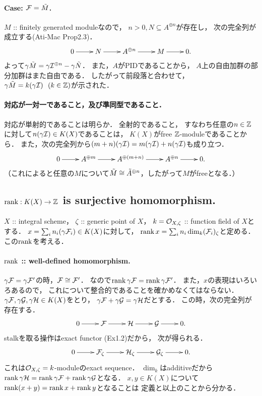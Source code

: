 \documentclass[a4paper]{jsarticle}
\begin{document}
    \paragraph{Case: $\mathcal{F}=\tilde{M}$.}
    $M$ :: finitely generated moduleなので，
    $n>0, N \subseteq A^{\oplus n}$が存在し，
    次の完全列が成立する(Ati-Mac Prop2.3)．
    \[
        \xymatrix
        {
            0 \ar[r]& N \ar[r]& A^{\oplus n} \ar[r]& M \ar[r]& 0.
        }
    \]
    よって$\gamma \tilde{M}=\gamma \mathcal{I}^{\oplus n}-\gamma \tilde{N}$．
    また，$A$がPIDであることから，
    $A$上の自由加群の部分加群はまた自由である．
    したがって前段落と合わせて，
    $\gamma \tilde{M}=k (\gamma \mathcal{I}) ~~(k \in \mathbb{Z})$が示された．

    \paragraph{対応が一対一であること，及び準同型であること．}
    対応が単射的であることは明らか．
    全射的であること，
    すなわち任意の$n \in \mathbb{Z}$に対して$n(\gamma\mathcal{I}) \in K(X)$であることは，
    $K(X)$がfree $\mathbb{Z}$-moduleであることから．
    また，次の完全列から$(m+n) (\gamma \mathcal{I})=m(\gamma \mathcal{I})+n(\gamma \mathcal{I})$も成り立つ．
    \[
        \xymatrix
        {
            0 \ar[r]& A^{\oplus m} \ar[r]& A^{\oplus (m+n)} \ar[r]& A^{\oplus n} \ar[r]& 0.
        }
    \]
    （これによると任意の$M$について$\tilde{M} \cong \tilde{A}^{\oplus n}$，したがって$M$がfreeとなる．）

    \subsection{$\operatorname{rank}: K(X) \to \mathbb{Z}$ is surjective homomorphism.}
    $X$ :: integral scheme，
    $\zeta$ :: generic point of $X$，
    $k=\mathcal{O}_{X, \zeta}$ :: function field of $X$とする．
    $x=\sum_{i} n_i (\gamma \mathcal{F}_i) \in K(X)$に対して，
    $\operatorname{rank} x=\sum_{i} n_i \dim_k (\mathcal{F}_i)_{\zeta}$と定める．
    この$\operatorname{rank}$を考える．

    \paragraph{$\operatorname{rank}$ :: well-defined homomorphism.}
    $\gamma \mathcal{F}=\gamma \mathcal{F}'$の時，$\mathcal{F} \cong \mathcal{F}'$．
    なので$\operatorname{rank} \gamma \mathcal{F}=\operatorname{rank} \gamma \mathcal{F}'$．
    また，$x$の表現はいろいろあるので，
    これについて整合的であることを確かめなくてはならない．
    $\gamma \mathcal{F}, \gamma \mathcal{G}, \gamma \mathcal{H} \in K(X)$をとり，
    $\gamma \mathcal{F}+\gamma \mathcal{G}=\gamma \mathcal{H}$だとする．
    この時，次の完全列が存在する．
    \[
        \xymatrix
        {
            0 \ar[r]& \shF \ar[r]& \shH \ar[r]& \shG \ar[r]& 0.
        }
    \]
    stalkを取る操作はexact functor (Ex1.2)だから，
    次が得られる．
    \[
        \xymatrix
        {
            0 \ar[r]& \shF_{\zeta} \ar[r]& \shH_{\zeta} \ar[r]& \shG_{\zeta} \ar[r]& 0.
        }
    \]
    これは$\mathcal{O}_{X, \zeta}=k$-moduleのexact sequence．
    $\dim_k$はadditiveだから
    $\operatorname{rank} \gamma \mathcal{H}=\operatorname{rank} \gamma \mathcal{F}+\operatorname{rank} \gamma \mathcal{G}$となる．
    $x, y \in K(X)$について$\operatorname{rank} (x+y)=\operatorname{rank} x+\operatorname{rank} y$となることは
    定義と以上のことから分かる．
\end{document}

